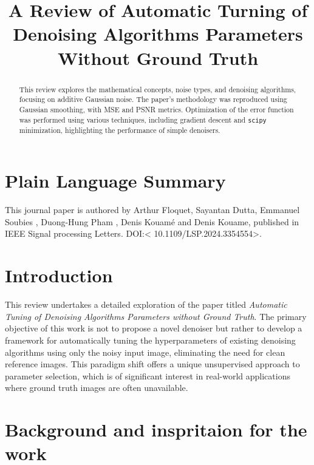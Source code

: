 \documentclass[
]{agujournal2019}
\begin{document}
\title{A Review of Automatic Turning of Denoising Algorithms Parameters
Without Ground Truth}



\begin{abstract}
This review explores the mathematical concepts, noise types, and
denoising algorithms, focusing on additive Gaussian noise. The paper's
methodology was reproduced using Gaussian smoothing, with MSE and PSNR
metrics. Optimization of the error function was performed using various
techniques, including gradient descent and \texttt{scipy} minimization,
highlighting the performance of simple denoisers.
\end{abstract}

\section*{Plain Language Summary}
This journal paper is authored by Arthur Floquet, Sayantan Dutta,
Emmanuel Soubies , Duong-Hung Pham , Denis Kouamé and Denis Kouame,
published in IEEE Signal processing Letters. DOI:\textless{}
10.1109/LSP.2024.3354554\textgreater.




\section{Introduction}\label{introduction}

This review undertakes a detailed exploration of the paper titled
\emph{Automatic Tuning of Denoising Algorithms Parameters without Ground
Truth}. The primary objective of this work is not to propose a novel
denoiser but rather to develop a framework for automatically tuning the
hyperparameters of existing denoising algorithms using only the noisy
input image, eliminating the need for clean reference images. This
paradigm shift offers a unique unsupervised approach to parameter
selection, which is of significant interest in real-world applications
where ground truth images are often unavailable.

\section{Background and inspritaion for the
work}\label{background-and-inspritaion-for-the-work}
\end{document}
